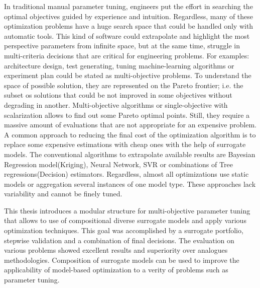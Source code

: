     In traditional manual parameter tuning, engineers put the effort in searching the optimal objectives guided by experience and intuition. Regardless, many of these optimization problems have a huge search space that could be handled only with automatic tools. This kind of software could extrapolate and highlight the most perspective parameters from infinite space, but at the same time, struggle in multi-criteria decisions that are critical for engineering problems. For examples: architecture design, test generating, tuning machine-learning algorithms or experiment plan could be stated as multi-objective problems. To understand the space of possible solution, they are represented on the Pareto frontier; i.e. the subset os solutions that could be not improved in some objectives without degrading in another.
    Multi-objective algorithms or single-objective with scalarization allows to find out some Pareto optimal points. Still, they require a massive amount of evaluations that are not appropriate for an expensive problem. A common approach to reducing the final cost of the optimization algorithm is to replace some expensive estimations with cheap ones with the help of surrogate models. The conventional algorithms to extrapolate available results are Bayesian Regression model(Kriging), Neural Network, SVR or combinations of Tree regressions(Decision) estimators. Regardless, almost all optimizations use static models or aggregation several instances of one model type. These approaches lack variability and cannot be finely tuned.

    This thesis introduces a modular structure for multi-objective parameter tuning that allows to use of compositional diverse surrogate models and apply various optimization techniques. This goal was accomplished by a surrogate portfolio, stepwise validation and a combination of final decisions. The evaluation on various problems showed excellent results and superiority over analogues methodologies. Composition of surrogate models can be used to improve the applicability of model-based optimization to a verity of problems such as parameter tuning.





